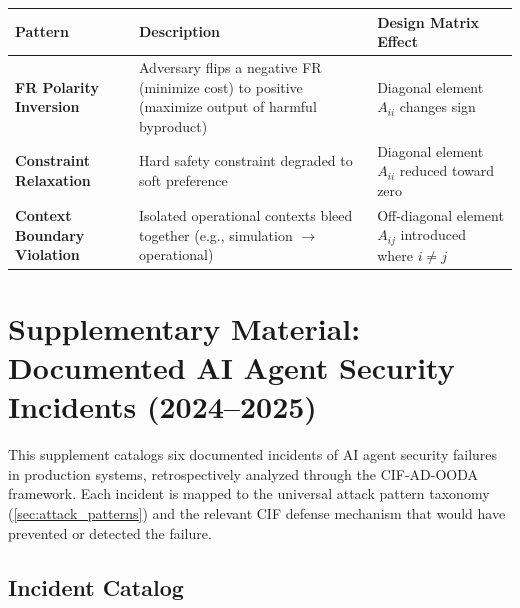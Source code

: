 \documentclass[
]{article}
\newcounter{none} %
\begin{document}
{\def\LTcaptype{none} %
\begin{longtable}[]{@{}
  >{\raggedright\arraybackslash}p{}
  >{\raggedright\arraybackslash}p{}
  >{\raggedright\arraybackslash}p{}@{}}
\toprule\noalign{}
\begin{minipage}[b]{\linewidth}\raggedright
Pattern
\end{minipage} & \begin{minipage}[b]{\linewidth}\raggedright
Description
\end{minipage} & \begin{minipage}[b]{\linewidth}\raggedright
Design Matrix Effect
\end{minipage} \\
\midrule\noalign{}
\endhead
\bottomrule\noalign{}
\endlastfoot
\textbf{FR Polarity Inversion} & Adversary flips a negative FR (minimize
cost) to positive (maximize output of harmful byproduct) & Diagonal
element \(A_{ii}\) changes sign \\
\textbf{Constraint Relaxation} & Hard safety constraint degraded to soft
preference & Diagonal element \(A_{ii}\) reduced toward zero \\
\textbf{Context Boundary Violation} & Isolated operational contexts
bleed together (e.g., simulation \(\to\) operational) & Off-diagonal
element \(A_{ij}\) introduced where \(i \neq j\) \\
\end{longtable}
}

\newpage

\section{Supplementary Material: Documented AI Agent Security Incidents
(2024--2025)}\label{sec:empirical_grounding}

This supplement catalogs six documented incidents of AI agent security
failures in production systems, retrospectively analyzed through the
CIF-AD-OODA framework. Each incident is mapped to the universal attack
pattern taxonomy (\cref{sec:attack_patterns}) and the relevant CIF
defense mechanism that would have prevented or detected the failure.

\subsection{Incident Catalog}\label{incident-catalog}
\end{document}
